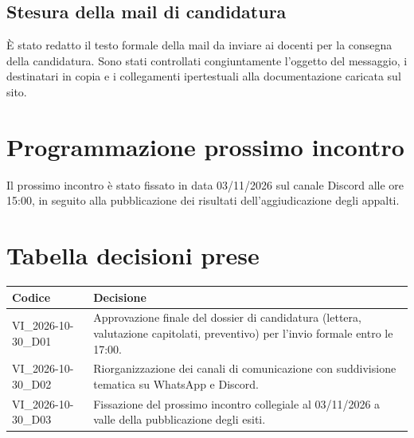 \subsection{Stesura della mail di candidatura}
È stato redatto il testo formale della mail da inviare ai docenti per la consegna della candidatura. Sono stati controllati congiuntamente l'oggetto del messaggio, i destinatari in copia e i collegamenti ipertestuali alla documentazione caricata sul sito.

\section{Programmazione prossimo incontro}
Il prossimo incontro è stato fissato in data 03/11/2026 sul canale Discord alle ore 15:00, in seguito alla pubblicazione dei risultati dell'aggiudicazione degli appalti.

\section{Tabella decisioni prese}
\renewcommand{\arraystretch}{1.3}
\noindent
\begin{tabularx}{\textwidth}{|l|X|}
    \hline
    \textbf{Codice} & \textbf{Decisione} \\
    \hline
    VI\_2026-10-30\_D01 & Approvazione finale del dossier di candidatura (lettera, valutazione capitolati, preventivo) per l'invio formale entro le 17:00. \\
    \hline
    VI\_2026-10-30\_D02 & Riorganizzazione dei canali di comunicazione con suddivisione tematica su WhatsApp e Discord. \\
    \hline
    VI\_2026-10-30\_D03 & Fissazione del prossimo incontro collegiale al 03/11/2026 a valle della pubblicazione degli esiti. \\
    \hline
\end{tabularx}
